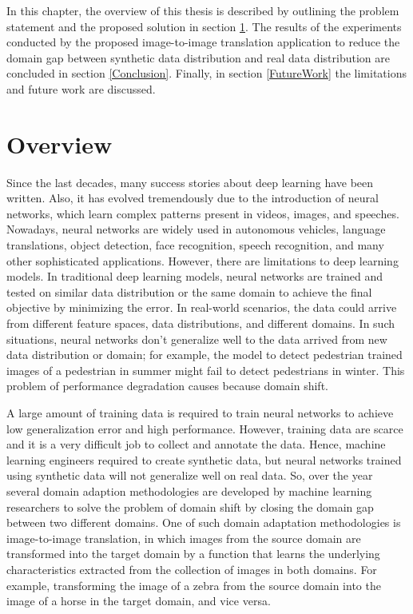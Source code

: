 \justifying
\setlength{\parskip}{1em}



In this chapter, the overview of this thesis is described by outlining the problem statement and the proposed solution in section \ref{Overview}. The results of the experiments conducted by the proposed image-to-image translation application to reduce the domain gap between synthetic data distribution and real data distribution are concluded in section \ref{Conclusion}. Finally, in section \ref{FutureWork} the limitations and future work are discussed.


\section{Overview}\label{Overview}

Since the last decades, many success stories about deep learning have been written. Also, it has evolved tremendously due to the introduction of neural networks, which learn complex patterns present in videos, images, and speeches. Nowadays, neural networks are widely used in autonomous vehicles, language translations, object detection, face recognition, speech recognition, and many other sophisticated applications. However, there are limitations to deep learning models. In traditional deep learning models, neural networks are trained and tested on similar data distribution or the same domain to achieve the final objective by minimizing the error. In real-world scenarios, the data could arrive from different feature spaces, data distributions, and different domains. In such situations, neural networks don't generalize well to the data arrived from new data distribution or domain; for example, the model to detect pedestrian trained images of a pedestrian in summer might fail to detect pedestrians in winter. This problem of performance degradation causes because domain shift\cite{farahani2020brief}.

A large amount of training data is required to train neural networks to achieve low generalization error and high performance. However, training data are scarce and it is a very difficult job to collect and annotate the data. Hence, machine learning engineers required to create synthetic data, but neural networks trained using synthetic data will not generalize well on real data. So, over the year several domain adaption methodologies are developed by machine learning researchers to solve the problem of domain shift by closing the domain gap between two different domains\cite{farahani2020brief}. One of such domain adaptation methodologies is image-to-image translation, in which images from the source domain are transformed into the target domain by a function that learns the underlying characteristics extracted from the collection of images in both domains. For example, transforming the image of a zebra from the source domain into the image of a horse in the target domain, and vice versa.


